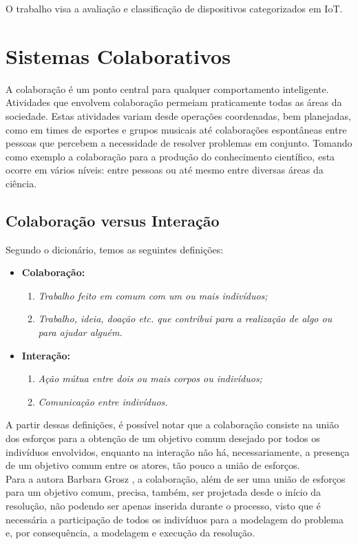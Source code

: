 O trabalho visa a avaliação e classificação de
dispositivos categorizados em \acrfull{IoT}. %

\section{Sistemas Colaborativos}
\qqad A colaboração é um ponto central para qualquer comportamento inteligente.
Atividades que envolvem colaboração permeiam praticamente todas as áreas da sociedade. Estas atividades variam desde operações coordenadas,
bem planejadas, como em times de esportes e grupos musicais até colaborações espontâneas
entre pessoas que percebem a necessidade de resolver problemas em conjunto.
Tomando como exemplo a colaboração para a produção do conhecimento científico, esta ocorre em vários níveis: entre pessoas ou até mesmo entre diversas áreas da ciência.
 \cite{cbarbara}
\subsection{Colaboração versus Interação}
Segundo o dicionário, temos as seguintes definições:%
\begin{itemize}
  \item \textbf{Colaboração:}
  \begin{enumerate}
    \item \textit{Trabalho feito em comum com um ou mais indivíduos;}
    \item \textit{Trabalho, ideia, doação etc. que contribui para a realização de algo ou para ajudar alguém.}
  \end{enumerate}
  \item \textbf{Interação:}
  \begin{enumerate}
    \item \textit{Ação mútua entre dois ou mais corpos ou indivíduos;}
    \item \textit{Comunicação entre indivíduos.}
  \end{enumerate}
\end{itemize}
 \null
\quad A partir dessas definições, é possível notar que a colaboração consiste na união dos esforços
para a obtenção de um objetivo comum desejado por todos os indivíduos envolvidos, enquanto na interação
não há, necessariamente, a presença de um objetivo comum entre os atores, tão pouco a união de esforços. \\ \null \quad
Para a autora Barbara Grosz \cite{cbarbara}, a colaboração, além de ser uma união de esforços para um objetivo comum,
precisa, também, ser projetada desde o início da resolução, não podendo ser apenas inserida durante o processo, visto que é
necessária a participação de todos os indivíduos para a modelagem do problema e, por consequência, a modelagem e execução da resolução.

